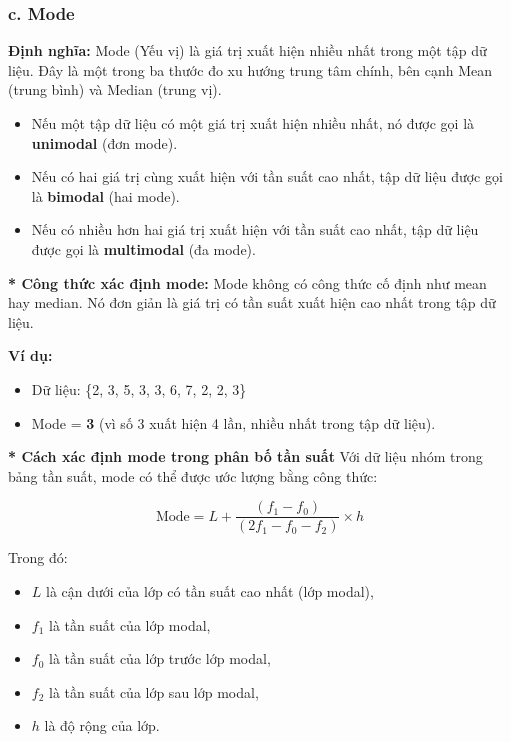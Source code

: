 \subsubsection{c. Mode}
\textbf{Định nghĩa: }
Mode (Yếu vị) là giá trị xuất hiện nhiều nhất trong một tập dữ liệu. Đây là một trong ba thước đo xu hướng trung tâm chính, bên cạnh Mean (trung bình) và Median (trung vị).

\begin{itemize}
    \item Nếu một tập dữ liệu có một giá trị xuất hiện nhiều nhất, nó được gọi là \textbf{unimodal} (đơn mode).
    \item Nếu có hai giá trị cùng xuất hiện với tần suất cao nhất, tập dữ liệu được gọi là \textbf{bimodal} (hai mode).
    \item Nếu có nhiều hơn hai giá trị xuất hiện với tần suất cao nhất, tập dữ liệu được gọi là \textbf{multimodal} (đa mode).
\end{itemize}

\textbf{* Công thức xác định mode: }
Mode không có công thức cố định như mean hay median. Nó đơn giản là giá trị có tần suất xuất hiện cao nhất trong tập dữ liệu.

\textbf{Ví dụ:}
\begin{itemize}
    \item Dữ liệu: \{2, 3, 5, 3, 3, 6, 7, 2, 2, 3\}
    \item Mode = \textbf{3} (vì số 3 xuất hiện 4 lần, nhiều nhất trong tập dữ liệu).
\end{itemize}

\textbf{* Cách xác định mode trong phân bố tần suất}
Với dữ liệu nhóm trong bảng tần suất, mode có thể được ước lượng bằng công thức:

\begin{equation}
\text{Mode} = L + \frac{(f_1 - f_0)}{(2f_1 - f_0 - f_2)} \times h
\end{equation}

Trong đó:
\begin{itemize}
    \item $L$ là cận dưới của lớp có tần suất cao nhất (lớp modal),
    \item $f_1$ là tần suất của lớp modal,
    \item $f_0$ là tần suất của lớp trước lớp modal,
    \item $f_2$ là tần suất của lớp sau lớp modal,
    \item $h$ là độ rộng của lớp.
\end{itemize}

